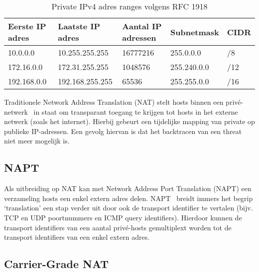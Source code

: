\begin{table}[!htbp]
    \caption{Private IPv4 adres ranges volgens RFC 1918}
    \label{tab:PrivateIPv4AdressRanges}
    \begin{tabular}{lllll}
        \hline
        \multicolumn{1}{|l|}{Eerste IP adres} & \multicolumn{1}{l|}{Laatste IP adres} & \multicolumn{1}{l|}{Aantal IP adressen} & \multicolumn{1}{l|}{Subnetmask} & \multicolumn{1}{l|}{CIDR} \\ \hline
        10.0.0.0                               & 10.255.255.255                       & 16777216                                    & 255.0.0.0                       & /8                        \\
        172.16.0.0                             & 172.31.255.255                       & 1048576                                     & 255.240.0.0                     & /12                       \\
        192.168.0.0                            & 192.168.255.255                      & 65536                                       & 255.255.0.0                     & /16
    \end{tabular}
\end{table}

Traditionele Network Address Translation (NAT) stelt hosts binnen een privé-netwerk~\autocite{Moskowitz1996} in staat om transparant toegang te krijgen tot hosts in het externe netwerk (zoals het internet).
Hierbij gebeurt een tijdelijke mapping van private op publieke IP-adressen. Een gevolg hiervan is dat het backtracen van een threat niet meer mogelijk is.

\subsection{NAPT}
Als uitbreiding op NAT kan met Network Address Port Translation (NAPT) een verzameling hosts een enkel extern adres delen. NAPT~\autocite{Holdrege1999} breidt immers het begrip ‘translation’ een stap verder uit door ook de transport identifier te vertalen (bijv. TCP en UDP poortnummers en ICMP query identifiers). Hierdoor kunnen de transport identifiers van een aantal privé-hosts gemultiplext worden tot de\\transport identifiers van een enkel extern adres.

\subsection{Carrier-Grade NAT}

